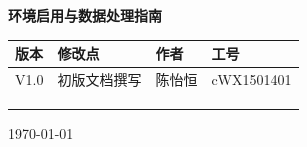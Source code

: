 \documentclass{fduthesis}
\begin{document}
\frontmatter
\begin{titlepage}
  \centering
  \vspace*{2.5cm}
  {\bfseries 环境启用与数据处理指南\par}
  \vfill
  {
  \renewcommand{\arraystretch}{1.5}
  \begin{tabular}{|L{0.12\textwidth}|L{0.40\textwidth}|L{0.14\textwidth}|L{0.14\textwidth}|}
    \hline
    版本 & 修改点 & 作者 & 工号 \\
    \hline
    V1.0 & 初版文档撰写 & 陈怡恒 & cWX1501401 \\
    \hline
    \rule{0pt}{2.2em} & & & \\
    \hline
    \rule{0pt}{2.2em} & & & \\
    \hline
    \rule{0pt}{2.2em} & & & \\
    \hline
  \end{tabular}\par}
  \vspace{1.5cm}
  {\today\par}
\end{titlepage}
\tableofcontents
\end{document}
